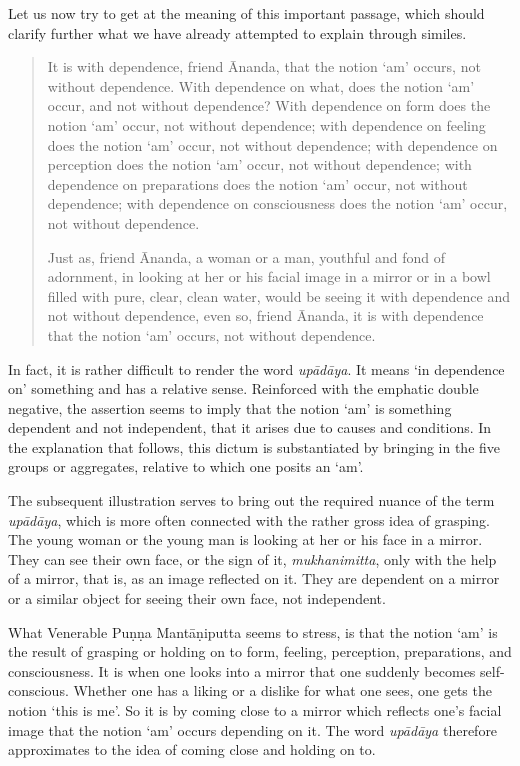 Let us now try to get at the meaning of this important passage, which should clarify further what we have already attempted to explain through similes.

\begin{quote}
It is with dependence, friend Ānanda, that the notion `am' occurs, not without dependence. With dependence on what, does the notion `am' occur, and not without dependence? With dependence on form does the notion `am' occur, not without dependence; with dependence on feeling does the notion `am' occur, not without dependence; with dependence on perception does the notion `am' occur, not without dependence; with dependence on preparations does the notion `am' occur, not without dependence; with dependence on consciousness does the notion `am' occur, not without dependence.

Just as, friend Ānanda, a woman or a man, youthful and fond of adornment, in looking at her or his facial image in a mirror or in a bowl filled with pure, clear, clean water, would be seeing it with dependence and not without dependence, even so, friend Ānanda, it is with dependence that the notion `am' occurs, not without dependence.
\end{quote}

In fact, it is rather difficult to render the word \emph{upādāya}. It means `in dependence on' something and has a relative sense. Reinforced with the emphatic double negative, the assertion seems to imply that the notion `am' is something dependent and not independent, that it arises due to causes and conditions. In the explanation that follows, this dictum is substantiated by bringing in the five groups or aggregates, relative to which one posits an `am'.

The subsequent illustration serves to bring out the required nuance of the term \emph{upādāya}, which is more often connected with the rather gross idea of grasping. The young woman or the young man is looking at her or his face in a mirror. They can see their own face, or the sign of it, \emph{mukhanimitta}, only with the help of a mirror, that is, as an image reflected on it. They are dependent on a mirror or a similar object for seeing their own face, not independent.

What Venerable Puṇṇa Mantāṇiputta seems to stress, is that the notion `am' is the result of grasping or holding on to form, feeling, perception, preparations, and consciousness. It is when one looks into a mirror that one suddenly becomes self-conscious. Whether one has a liking or a dislike for what one sees, one gets the notion `this is me'. So it is by coming close to a mirror which reflects one's facial image that the notion `am' occurs depending on it. The word \emph{upādāya} therefore approximates to the idea of coming close and holding on to.

